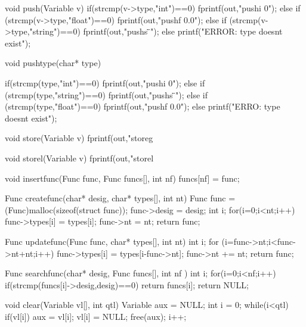 \documentclass{report}
\begin{document}
\begin{code}
   void push(Variable v){
      if(strcmp(v->type,"int")==0){
         fprintf(out,"pushi 0\n");
      }else if (strcmp(v->type,"float")==0){
         fprintf(out,"pushf 0.0\n");
      }else if (strcmp(v->type,"string")==0){
         fprintf(out,"pushs \"\"\n");
      }else {
         printf("ERROR: type doesnt exist");
      }
   }

   void pushtype(char* type){
      if(strcmp(type,"int")==0){
         fprintf(out,"pushi 0\n");  
      }else if (strcmp(type,"string")==0){
         fprintf(out,"pushs \"\"\n");
      }else if (strcmp(type,"float")==0){
         fprintf(out,"pushf 0.0\n");
      }else {
         printf("ERRO: type doesnt exist");   
      }

    }

   void store(Variable v){
      fprintf(out,"storeg %
   }

   void storel(Variable v){
        fprintf(out,"storel %
    }

   void insertfunc(Func func, Func funcs[], int nf){
        funcs[nf] = func;
    }
    
    Func createfunc(char* desig, char* types[], int nt){
        Func func = (Func)malloc(sizeof(struct func));
        func->desig = desig;
        int i;
        for(i=0;i<nt;i++){
            func->types[i] = types[i];
        }
        func->nt = nt;
        return func;
    }

    Func updatefunc(Func func, char* types[], int nt){
        int i;
        for (i=func->nt;i<func->nt+nt;i++){
            func->types[i] = types[i-func->nt];
        }
        func->nt += nt;
        return func;
    }

    Func searchfunc(char* desig, Func funcs[], int nf ){
        int i;
        for(i=0;i<nf;i++){
            if(strcmp(funcs[i]->desig,desig)==0){
                return funcs[i];
            }
        }
        return NULL;
    }

   void clear(Variable vl[], int qtl){
        Variable aux = NULL;
        int i = 0;
        while(i<qtl){
            if(vl[i]){
                aux = vl[i];
                vl[i] = NULL;
                free(aux);
                i++;
            }
        }
    }






\end{code}
\end{document}
